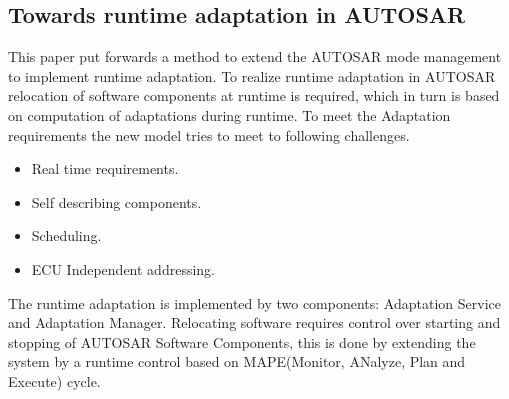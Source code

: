 \subsection{Towards runtime adaptation in AUTOSAR}
This paper put forwards a method to extend the AUTOSAR mode management to implement runtime adaptation.
To realize runtime adaptation in AUTOSAR relocation of software components at runtime is required, which in turn is based on computation of adaptations during runtime.
To meet the Adaptation requirements the new model tries to meet to following challenges.
\begin{itemize}
	\item Real time requirements.
	\item Self describing components.
	\item Scheduling.
	\item ECU Independent addressing.
\end{itemize}
The runtime adaptation is implemented by two components: Adaptation Service and Adaptation Manager.
Relocating software requires control over starting and stopping of AUTOSAR Software Components, this is done by extending the system by a runtime control based on MAPE(Monitor, ANalyze, Plan and Execute) cycle.


